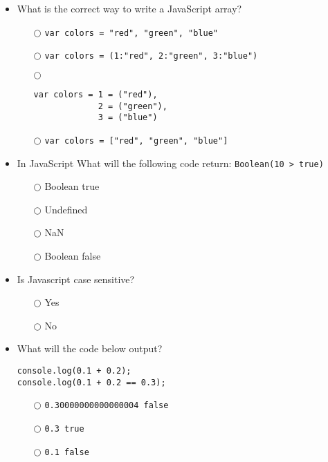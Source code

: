 \documentclass[10pt,twocolumn]{article}
\begin{document}
\begin{itemize}
    \item What is the correct way to write a JavaScript array?
          \begin{itemize}
              \item[$\bigcirc$] \verb_var colors = "red", "green", "blue"_
              \item[$\bigcirc$] \verb_var colors = (1:"red", 2:"green", 3:"blue")_
              \item[$\bigcirc$]
                    \begin{verbatim}
var colors = 1 = ("red"),
             2 = ("green"),
             3 = ("blue")
\end{verbatim}
              \item[$\bigcirc$] \verb_var colors = ["red", "green", "blue"]_
          \end{itemize}
\end{itemize}
\begin{itemize}
    \item In JavaScript What will the following code return: \verb=Boolean(10 > true)=
          \begin{itemize}
              \item[$\bigcirc$] Boolean true
              \item[$\bigcirc$] Undefined
              \item[$\bigcirc$] NaN
              \item[$\bigcirc$] Boolean false
          \end{itemize}
\end{itemize}
\begin{itemize}
    \item Is Javascript case sensitive?
          \begin{itemize}
              \item[$\bigcirc$] Yes
              \item[$\bigcirc$] No
          \end{itemize}
\end{itemize}
\begin{itemize}
    \item What will the code below output?
          \begin{verbatim}
console.log(0.1 + 0.2);
console.log(0.1 + 0.2 == 0.3);
\end{verbatim}
          \begin{itemize}
              \item[$\bigcirc$] \verb=0.30000000000000004 false=
              \item[$\bigcirc$] \verb=0.3 true=
              \item[$\bigcirc$] \verb=0.1 false=
          \end{itemize}
\end{itemize}
\end{document}
